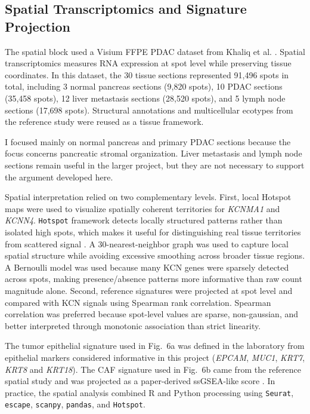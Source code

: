 \documentclass[11pt,a4paper]{article}
\begin{document}
\subsection{Spatial Transcriptomics and Signature Projection}
The spatial block used a Visium FFPE PDAC dataset from Khaliq et al. \citep{khaliq2024}. Spatial transcriptomics measures RNA expression at spot level while preserving tissue coordinates. In this dataset, the 30 tissue sections represented 91,496 spots in total, including 3 normal pancreas sections (9,820 spots), 10 PDAC sections (35,458 spots), 12 liver metastasis sections (28,520 spots), and 5 lymph node sections (17,698 spots). Structural annotations and multicellular ecotypes from the reference study were reused as a tissue framework.

I focused mainly on normal pancreas and primary PDAC sections because the focus concerns pancreatic stromal organization. Liver metastasis and lymph node sections remain useful in the larger project, but they are not necessary to support the  argument developed here.

Spatial interpretation relied on two complementary levels. First, local Hotspot maps were used to visualize spatially coherent territories for \textit{KCNMA1} and \textit{KCNN4}. \texttt{Hotspot} framework detects locally structured patterns rather than isolated high spots, which makes it useful for distinguishing real tissue territories from scattered signal \citep{detomaso2021}. A 30-nearest-neighbor graph was used to capture local spatial structure while avoiding excessive smoothing across broader tissue regions. A Bernoulli model was used because many KCN genes were sparsely detected across spots, making presence/absence patterns more informative than raw count magnitude alone. Second, reference signatures were projected at spot level and compared with KCN signals using Spearman rank correlation. Spearman correlation was preferred because spot-level values are sparse, non-gaussian, and better interpreted through monotonic association than strict linearity.

The tumor epithelial signature used in Fig.~6a was defined in the laboratory from epithelial markers considered informative in this project (\textit{EPCAM}, \textit{MUC1}, \textit{KRT7}, \textit{KRT8} and \textit{KRT18}). The CAF signature used in Fig.~6b came from the reference spatial study and was projected as a paper-derived ssGSEA-like score \citep{khaliq2024}. In practice, the spatial analysis combined R and Python processing using \texttt{Seurat}, \texttt{escape}, \texttt{scanpy}, \texttt{pandas}, and \texttt{Hotspot}.
\end{document}
